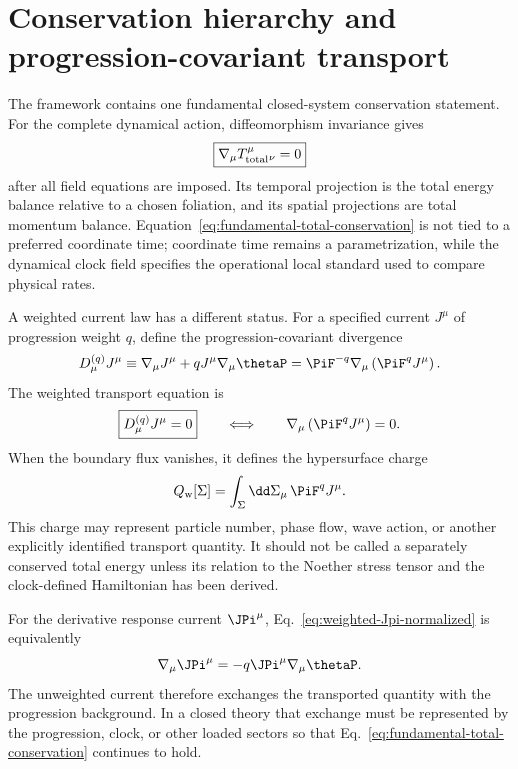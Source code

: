\documentclass[12pt]{article}
\begin{document}
\section{Conservation hierarchy and progression-covariant transport}
\label{sec:conservation-hierarchy}

The framework contains one fundamental closed-system conservation statement.  For the complete dynamical action, diffeomorphism invariance gives
\begin{equation}
    \boxed{\nabla_\mu T_{\rm total}^{\mu}{}_{\nu}=0}
    \label{eq:fundamental-total-conservation}
\end{equation}
after all field equations are imposed.  Its temporal projection is the total energy balance relative to a chosen foliation, and its spatial projections are total momentum balance.  Equation~\eqref{eq:fundamental-total-conservation} is not tied to a preferred coordinate time; coordinate time remains a parametrization, while the dynamical clock field specifies the operational local standard used to compare physical rates.

A weighted current law has a different status.  For a specified current \(J^\mu\) of progression weight \(q\), define the progression-covariant divergence
\begin{equation}
    D_\mu^{(q)}J^\mu
    \equiv
    \nabla_\mu J^\mu
    +qJ^\mu\nabla_\mu\thetaP
    =\PiF^{-q}\nabla_\mu\left(\PiF^qJ^\mu\right).
    \label{eq:progression-covariant-divergence}
\end{equation}
The weighted transport equation is
\begin{equation}
    \boxed{D_\mu^{(q)}J^\mu=0}
    \qquad\Longleftrightarrow\qquad
    \nabla_\mu\left(\PiF^qJ^\mu\right)=0.
    \label{eq:weighted-Jpi-normalized}
\end{equation}
When the boundary flux vanishes, it defines the hypersurface charge
\begin{equation}
    Q_{\rm w}[\Sigma]
    =\int_\Sigma \dd\Sigma_\mu\,\PiF^qJ^\mu .
    \label{eq:weighted-hypersurface-charge}
\end{equation}
This charge may represent particle number, phase flow, wave action, or another explicitly identified transport quantity.  It should not be called a separately conserved total energy unless its relation to the Noether stress tensor and the clock-defined Hamiltonian has been derived.

For the derivative response current \(\JPi^\mu\), Eq.~\eqref{eq:weighted-Jpi-normalized} is equivalently
\begin{equation}
    \nabla_\mu\JPi^\mu
    =-q\JPi^\mu\nabla_\mu\thetaP.
    \label{eq:div-Jpi-normalized}
\end{equation}
The unweighted current therefore exchanges the transported quantity with the progression background.  In a closed theory that exchange must be represented by the progression, clock, or other loaded sectors so that Eq.~\eqref{eq:fundamental-total-conservation} continues to hold.
\end{document}
